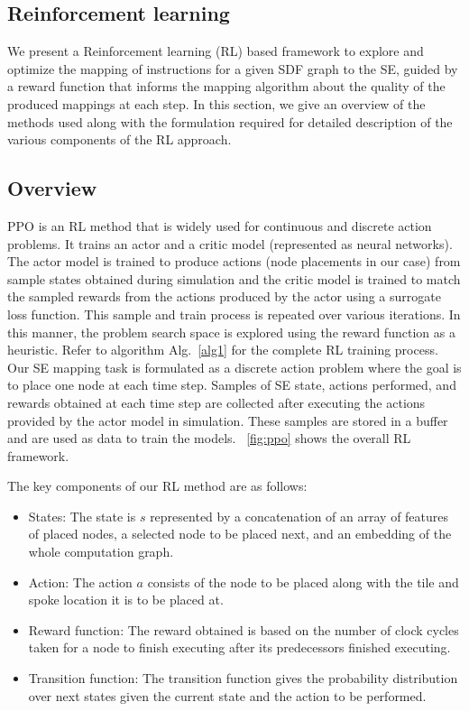\subsection{Reinforcement learning}

We present a Reinforcement learning (RL) based framework to explore and optimize the mapping of instructions for a given SDF graph to the SE, guided by a reward function that informs the mapping algorithm about the quality of the produced mappings at each step. In this section, we give an overview of the methods used along with the formulation required for detailed description of the various components of the RL approach.

\subsection{Overview}
PPO \cite{schulman2017proximal} is an RL method that is  widely used for continuous and discrete action problems. 
It trains an actor and a critic model (represented as neural networks).
The actor model is trained to produce actions (node placements in our case) from sample states obtained during simulation and the critic model is trained to match the sampled rewards from the actions produced by the actor using a surrogate loss function. 
This sample and train process is repeated over various iterations. 
In this manner, the problem search space is explored using the reward function as a heuristic.
Refer to algorithm Alg.~\ref{alg1} for the complete RL training process.
Our SE mapping task is formulated as a discrete action problem where the goal is to place one node at each time step. 
Samples of SE state, actions performed, and rewards obtained at each time step are collected after executing the actions provided by the actor model in simulation. 
These samples are stored in a buffer and are used as data to train the models.
\figurename~\ref{fig:ppo} shows the overall RL framework. 

The key components of our RL method are as follows:
\begin{itemize}
  \item States: The state is $s$ represented by a concatenation of an array of features of placed nodes, a selected node to be placed next, and an embedding of the whole computation graph. 
  \item Action: The action $a$ consists of the node to be placed along with the tile and spoke location it is to be placed at.
  \item Reward function: The reward obtained is based on the number of clock cycles taken for a node to finish executing after its predecessors finished executing.
  \item Transition function: The transition function gives the probability distribution over next states given the current state and the action to be performed.
\end{itemize}

